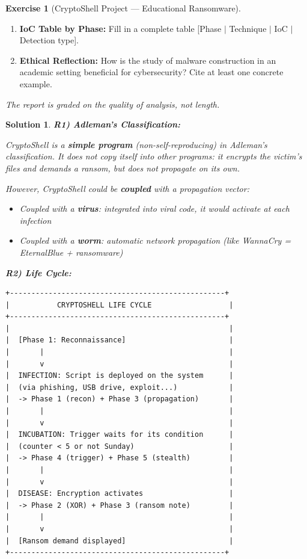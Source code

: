 \documentclass[a4paper,11pt]{article}
\theoremstyle{plain}
\newtheorem{correction}{Solution}
\theoremstyle{definition}
\newtheorem{exercice}{Exercise}
\begin{document}
\begin{exercice}[CryptoShell Project --- Educational Ransomware]
\begin{enumerate}
\item[\textbf{R5)}] \textbf{IoC Table by Phase:} Fill in a complete table [Phase $|$ Technique $|$ IoC $|$ Detection type].

\item[\textbf{R6)}] \textbf{Ethical Reflection:} How is the study of malware construction in an academic setting beneficial for cybersecurity? Cite at least one concrete example.
\end{enumerate}

\medskip
\noindent\textit{The report is graded on the quality of analysis, not length.}

\begin{correction}

\textbf{R1) Adleman's Classification:}

CryptoShell is a \textbf{simple program} (non-self-reproducing) in Adleman's classification. It does not copy itself into other programs: it encrypts the victim's files and demands a ransom, but does not propagate on its own.

However, CryptoShell could be \textbf{coupled} with a propagation vector:
\begin{itemize}
    \item Coupled with a \textbf{virus}: integrated into viral code, it would activate at each infection
    \item Coupled with a \textbf{worm}: automatic network propagation (like WannaCry = EternalBlue + ransomware)
\end{itemize}

\medskip
\textbf{R2) Life Cycle:}
\begin{lstlisting}[numbers=none,frame=none,backgroundcolor=\color{white},language={}]
+--------------------------------------------------+
|           CRYPTOSHELL LIFE CYCLE                  |
+--------------------------------------------------+
|                                                   |
|  [Phase 1: Reconnaissance]                        |
|       |                                           |
|       v                                           |
|  INFECTION: Script is deployed on the system      |
|  (via phishing, USB drive, exploit...)            |
|  -> Phase 1 (recon) + Phase 3 (propagation)       |
|       |                                           |
|       v                                           |
|  INCUBATION: Trigger waits for its condition      |
|  (counter < 5 or not Sunday)                      |
|  -> Phase 4 (trigger) + Phase 5 (stealth)         |
|       |                                           |
|       v                                           |
|  DISEASE: Encryption activates                    |
|  -> Phase 2 (XOR) + Phase 3 (ransom note)         |
|       |                                           |
|       v                                           |
|  [Ransom demand displayed]                        |
+--------------------------------------------------+
\end{lstlisting}


\end{correction}
\end{exercice}
\end{document}
